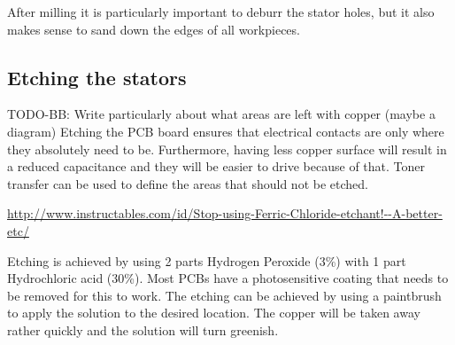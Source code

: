 \documentclass{article}
\begin{document}
After milling it is particularly important to deburr the stator holes, but it also makes sense to sand down the edges of all workpieces.

%
%
%
%

\subsection{Etching the stators}
\label{s:driver:etching}
TODO-BB: Write particularly about what areas are left with copper (maybe a diagram)
Etching the PCB board ensures that electrical contacts are only where they absolutely need to be. Furthermore, having less copper surface will result in a reduced capacitance and they will be easier to drive because of that. Toner transfer can be used to define the areas that should not be etched.

\url{http://www.instructables.com/id/Stop-using-Ferric-Chloride-etchant!--A-better-etc/}

Etching is achieved by using 2 parts Hydrogen Peroxide (3\%) with 1 part Hydrochloric acid (30\%). Most PCBs have a photosensitive coating that needs to be removed for this to work. The etching can be achieved by using a paintbrush to apply the solution to the desired location. The copper will be taken away rather quickly and the solution will turn greenish.
\end{document}
